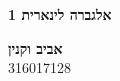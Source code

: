 \documentclass[a4paper, 12pt, leqno]{article}
\begin{document}
\begin{titlepage}
    \begin{center}
        \vspace*{4cm}
        {\fontsize{35pt}{35pt}\selectfont \textbf{אלגברה לינארית 1}}
        \vspace{0.4cm}

        {}
        \vfill

        {\Large\textbf{אביב וקנין}\\
        316017128}
    \end{center}
\end{titlepage}

\section{}


\end{document}
